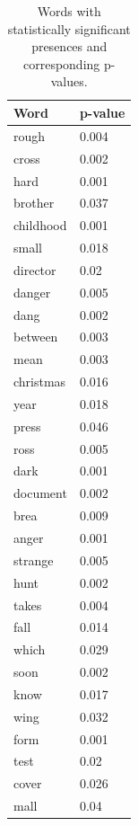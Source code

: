 \documentclass[12pt, oneside]{article}   	%
\begin{document}
\begin{table}[H]
\begin{tabular}[t]{l|l}
\textbf{Word}        & \textbf{p-value} \\ \hline
rough       & 0.004    \\
cross       & 0.002    \\
hard        & 0.001    \\
brother     & 0.037    \\
childhood   & 0.001    \\
small       & 0.018    \\
director    & 0.02     \\
danger      & 0.005    \\
dang        & 0.002    \\
between     & 0.003    \\
mean        & 0.003    \\
christmas   & 0.016    \\
year        & 0.018    \\
press       & 0.046    \\
ross        & 0.005    \\
dark        & 0.001    \\
document    & 0.002    \\
brea        & 0.009    \\
anger       & 0.001    \\
strange     & 0.005    \\
hunt        & 0.002    \\
takes       & 0.004    \\
fall        & 0.014    \\
which       & 0.029    \\
soon        & 0.002    \\
know        & 0.017    \\
wing        & 0.032    \\
form        & 0.001    \\
test        & 0.02     \\
cover       & 0.026    \\
mall        & 0.04     \\
\end{tabular}
\caption{\label{table:word_p_values}Words with statistically significant presences and corresponding p-values.}
\end{table}

\end{document}
